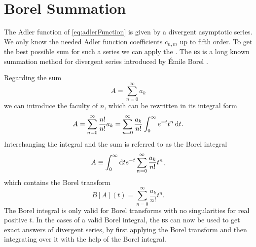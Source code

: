\documentclass[../../index.tex]{subfiles}
\begin{document}
\section{Borel Summation}
The Adler function of \cref{eq:adlerFunction} is given by a divergent asymptotic series.
We only know the needed Adler function coefficients \(c_{n,m}\) up to fifth
order. To get the best possible sum for such a series we can apply the
. The \textsc{bs} is a long known summation method
for divergent series introduced by Émile Borel \cite{Emile1899}.

Regarding the sum
\begin{equation}
  A = \sum_{n=0}^{\infty} a_k
\end{equation}
we can introduce the faculty of \(n\), which can be rewritten in its integral
form
\begin{equation}
  A = \sum_{n=0}^\infty \frac{n!}{n!} a_k = \sum_{n=0}^{\infty} \frac{a_k}{n!} \int_0^\infty e^{-t} t^n \dif t.
\end{equation}
Interchanging the integral and the sum is referred to as the Borel integral
\begin{equation}
  A \equiv \int_0^\infty \dif t e^{-t} \sum_{n=0}^\infty \frac{a_k}{n!} t^n,
  \label{eq:borelSum}
\end{equation}
which contains the Borel transform
\begin{equation}
  B[A](t) = \sum_{n=0}^\infty \frac{a_k}{n!} t^n.
\end{equation}
The Borel integral is only valid for Borel transforms with no singularities
for real positive \(t\). In the cases of a valid Borel integral, the
\textsc{bs} can now be used to get exact answers of divergent series, by first
applying the Borel transform and then integrating over it with the help of the
Borel integral.
\end{document}
